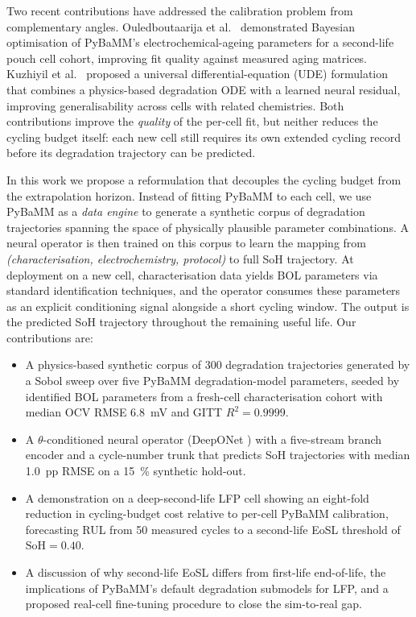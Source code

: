 \documentclass[preprint,12pt,3p,authoryear]{elsarticle}
\begin{document}
Two recent contributions have addressed the calibration problem from
complementary angles. Ouledboutaarija et al.\ \citep{ouledboutaarija2025}
demonstrated Bayesian optimisation of PyBaMM's electrochemical-ageing
parameters for a second-life pouch cell cohort, improving fit quality
against measured aging matrices. Kuzhiyil et al.\
\citep{kuzhiyil2025generalisability} proposed a universal
differential-equation (UDE) formulation that combines a physics-based
degradation ODE with a learned neural residual, improving
generalisability across cells with related chemistries. Both
contributions improve the \emph{quality} of the per-cell fit, but
neither reduces the cycling budget itself: each new cell still requires
its own extended cycling record before its degradation trajectory can
be predicted.

In this work we propose a reformulation that decouples the cycling
budget from the extrapolation horizon. Instead of fitting PyBaMM to each
cell, we use PyBaMM as a \emph{data engine} to generate a synthetic
corpus of degradation trajectories spanning the space of physically
plausible parameter combinations. A neural operator is then trained on
this corpus to learn the mapping from
\emph{(characterisation, electrochemistry, protocol)} to full SoH
trajectory. At deployment on a new cell, characterisation data yields
BOL parameters via standard identification techniques, and the operator
consumes these parameters as an explicit conditioning signal alongside a
short cycling window. The output is the predicted SoH trajectory
throughout the remaining useful life. Our contributions are:

\begin{itemize}
    \item A physics-based synthetic corpus of \num{300} degradation
    trajectories generated by a Sobol sweep over five PyBaMM
    degradation-model parameters, seeded by identified BOL parameters
    from a fresh-cell characterisation cohort with median OCV RMSE
    \SI{6.8}{\milli\volt} and GITT \(R^2 = 0.9999\).
    \item A \(\theta\)-conditioned neural operator (DeepONet
    \citep{lu2021learning}) with a five-stream branch encoder and a
    cycle-number trunk that predicts SoH trajectories with median
    \SI{1.0}{pp} RMSE on a \qty{15}{\percent} synthetic hold-out.
    \item A demonstration on a deep-second-life LFP cell showing an
    eight-fold reduction in cycling-budget cost relative to per-cell
    PyBaMM calibration, forecasting RUL from \num{50} measured cycles to
    a second-life EoSL threshold of \(\text{SoH}=0.40\).
    \item A discussion of why second-life EoSL differs from first-life
    end-of-life, the implications of PyBaMM's default degradation
    submodels for LFP, and a proposed real-cell fine-tuning procedure to
    close the sim-to-real gap.
\end{itemize}
\end{document}
